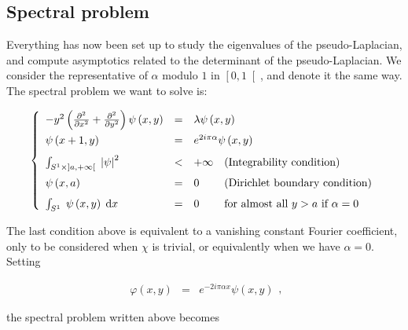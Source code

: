 \documentclass{jams-l}
\theoremstyle{definition}
\theoremstyle{remark}
\numberwithin{equation}{section}
\begin{document}
        
    
    
    \subsection{Spectral problem}
    \label{SubSecSpectralProblem}
    
        Everything has now been set up to study the eigenvalues of the pseudo-Laplacian, and compute asymptotics related to the determinant of the pseudo-Laplacian. We consider the representative of $\alpha$ modulo $1$ in $\left[ 0,1 \right[$, and denote it the same way. The spectral problem we want to solve is:
        
        \[ \left \{ \begin{array}{llll}
                - y^2 \left( \frac{\partial^2}{\partial x^2} + \frac{\partial^2}{\partial y^2} \right) \psi \left( x, y \right) & = & \multicolumn{2}{l}{\lambda \psi \left( x, y \right)} \\[0.7em]
                
                \psi \left( x+1, y \right) & = & \multicolumn{2}{l}{e^{2 i \pi \alpha} \psi \left( x, y \right)} \\[0.7em]
                
                \int_{S^1 \times \left] a, +\infty \right[} \; \left \vert \psi \right \vert^2 & < & + \infty & \text{(Integrability condition)} \\[0.7em]
                
                \psi \left( x, a \right) & = & 0 & \text{(Dirichlet boundary condition)} \\[0.7em]
                
                \int_{S^1} \; \psi \left( x, y \right) \; \mathrm{d}x & = & 0 &  \text{for almost all } y > a \text{ if } \alpha = 0
            \end{array} \right. \]
        
        The last condition above is equivalent to a vanishing constant Fourier coefficient, only to be considered when $\chi$ is trivial, or equivalently when we have $\alpha = 0$. Setting
        
        \[ \begin{array}{lll}
                \varphi \left( x, y \right) & = & e^{- 2 i \pi \alpha x} \psi \left( x, y \right)
            \end{array} , \]
        
        \noindent the spectral problem written above becomes
        
\end{document}
